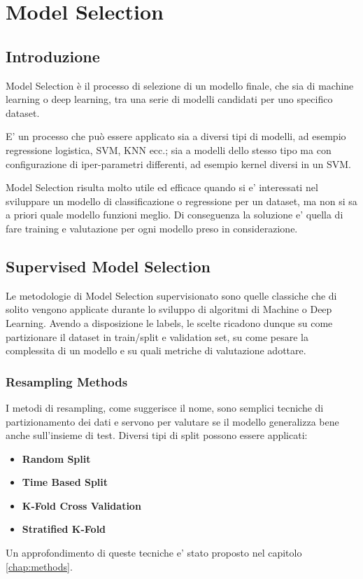 \chapter{Model Selection}
\label{chap:modelselection}

\section{Introduzione}
Model Selection è il processo di selezione di un modello finale, che sia di machine learning o deep learning, tra una serie di modelli candidati per uno specifico dataset.

E' un processo che può essere applicato sia a diversi tipi di modelli, ad esempio regressione logistica, SVM, KNN ecc.; sia a modelli dello stesso tipo ma con configurazione di iper-parametri differenti, ad esempio kernel diversi in un SVM.

Model Selection risulta molto utile ed efficace quando si e' interessati nel sviluppare un modello di classificazione o regressione per un dataset, ma non si sa a priori quale modello funzioni meglio. Di conseguenza la soluzione e' quella di fare training e valutazione per ogni modello preso in considerazione.




\section{Supervised Model Selection}
Le metodologie di Model Selection supervisionato sono quelle classiche che di solito vengono applicate durante lo sviluppo di algoritmi di Machine o Deep Learning. Avendo a disposizione le labels, le scelte ricadono dunque su come partizionare il dataset in train/split e validation set, su come pesare la complessita di un modello e su quali metriche di valutazione adottare.

\subsection{Resampling Methods}
I metodi di resampling, come suggerisce il nome, sono semplici tecniche di partizionamento dei dati e servono per valutare se il modello generalizza bene anche sull'insieme di test. Diversi tipi di split possono essere applicati:
\begin{itemize}
	\item \textbf{Random Split}
	\item \textbf{Time Based Split} 
	\item \textbf{K-Fold Cross Validation}
	\item \textbf{Stratified K-Fold}
\end{itemize}
Un approfondimento di queste tecniche e' stato proposto nel capitolo \ref{chap:methods}.

